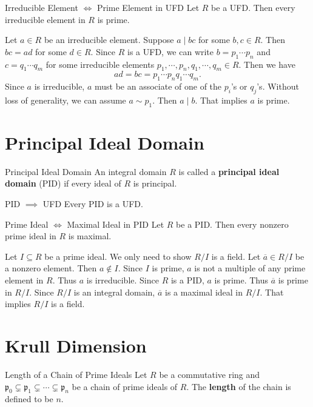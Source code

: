 \begin{proposition}{Irreducible Element $\iff$ Prime Element in UFD}{}
    Let $R$ be a UFD. Then every irreducible element in $R$ is prime.
\end{proposition}

\begin{prf}
    Let $a\in R$ be an irreducible element. Suppose $a\mid bc$ for some $b,c\in R$. Then $bc=ad$ for some $d\in R$. Since $R$ is a UFD, we can write $b=p_1\cdots p_n$ and $c=q_1\cdots q_m$ for some irreducible elements $p_1,\cdots,p_n,q_1,\cdots,q_m\in R$. Then we have $$ad=bc=p_1\cdots p_nq_1\cdots q_m.$$ Since $a$ is irreducible, $a$ must be an associate of one of the $p_i$'s or $q_j$'s. Without loss of generality, we can assume $a\sim p_1$. Then $a\mid b$. That implies $a$ is prime.
\end{prf}


\section{Principal Ideal Domain}
\begin{definition}{Principal Ideal Domain}{}
    An integral domain $R$ is called a \textbf{principal ideal domain} (PID) if every ideal of $R$ is principal.
\end{definition}


\begin{proposition}{PID $\implies$ UFD}{}
    Every PID is a UFD.
\end{proposition}


\begin{proposition}{Prime Ideal $\iff$ Maximal Ideal in PID}{}
    Let $R$ be a PID. Then every nonzero prime ideal in $R$ is maximal.
\end{proposition}

\begin{prf}
    Let $I\subseteq R$ be a prime ideal. We only need to show $R/I$ is a field. Let $\overline{a}\in R/I$ be a nonzero element. Then $a\notin I$. Since $I$ is prime, $a$ is not a multiple of any prime element in $R$. Thus $a$ is irreducible. Since $R$ is a PID, $a$ is prime. Thus $\overline{a}$ is prime in $R/I$. Since $R/I$ is an integral domain, $\overline{a}$ is a maximal ideal in $R/I$. That implies $R/I$ is a field.
\end{prf}


\section{Krull Dimension}
\begin{definition}{Length of a Chain of Prime Ideals}{}
    Let $R$ be a commutative ring and $\mathfrak{p}_0\subsetneq\mathfrak{p}_1\subsetneq\cdots\subsetneq\mathfrak{p}_n$ be a chain of prime ideals of $R$. The \textbf{length} of the chain is defined to be $n$.
\end{definition}


